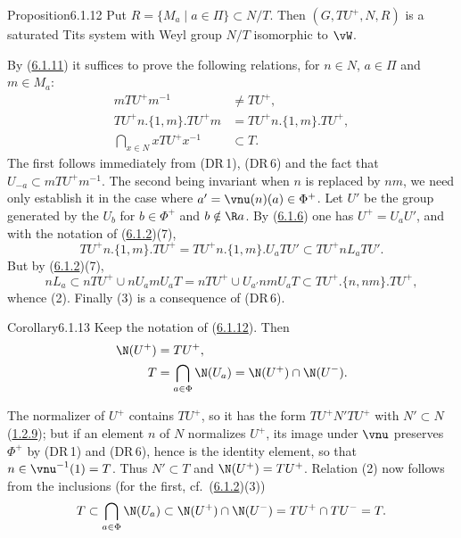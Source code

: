 \documentclass[12pt,a4paper,oneside,english]{smfart}
\makeatletter
\newcommand{\btanchor}[1]{\leavevmode\Hy@raisedlink{\hypertarget{bt:#1}{}}}
\newcommand{\btref}[1]{\hyperlink{bt:#1}{#1}}
\theoremstyle{definition}
\theoremstyle{bt}
\makeatother
\begin{document}
\begin{stmt}{Proposition}{6.1.12}\btanchor{6.1.12}
Put $R=\{M_a\mid a\in\Pi\}\subset N/T$. Then $(G,TU^{+},N,R)$ is a saturated Tits
system with Weyl group $N/T$ isomorphic to $\vW$.
\end{stmt}

\begin{sketch}
By (\btref{6.1.11}) it suffices to prove the following relations, for $n\in N$, $a\in\Pi$
and $m\in M_a$:
\begin{align}
mTU^{+}m^{-1}&\ne TU^{+},\\
TU^{+}n.\{1,m\}.TU^{+}m&=TU^{+}n.\{1,m\}.TU^{+},\\
\bigcap_{x\in N}xTU^{+}x^{-1}&\subset T.
\end{align}
The first follows immediately from (DR\,1), (DR\,6) and the fact that
$U_{-a}\subset mTU^{+}m^{-1}$. The second being invariant when $n$ is replaced by
$nm$, we need only establish it in the case where $a'=\vnu(n)(a)\in\Phi^{+}$. Let
$U'$ be the group generated by the $U_b$ for $b\in\Phi^{+}$ and $b\notin\R a$. By
(\btref{6.1.6}) one has $U^{+}=U_aU'$, and with the notation of (\btref{6.1.2})(7),
\[ TU^{+}n.\{1,m\}.TU^{+}=TU^{+}n.\{1,m\}.U_aTU'\subset TU^{+}nL_aTU'. \]
But by (\btref{6.1.2})(7),
\[ nL_a\subset nTU^{+}\cup nU_amU_aT=nTU^{+}\cup U_{a'}nmU_aT
   \subset TU^{+}.\{n,nm\}.TU^{+}, \]
whence (2). Finally (3) is a consequence of (DR\,6).
\end{sketch}

\begin{stmt}{Corollary}{6.1.13}\btanchor{6.1.13}
Keep the notation of (\btref{6.1.12}). Then
\begin{align}
\N(U^{+})&=TU^{+},\\
T&=\bigcap_{a\in\Phi}\N(U_a)=\N(U^{+})\cap\N(U^{-}).
\end{align}
\end{stmt}

\begin{sketch}
The normalizer of $U^{+}$ contains $TU^{+}$, so it has the form $TU^{+}N'TU^{+}$
with $N'\subset N$ (\btref{1.2.9}); but if an element $n$ of $N$ normalizes $U^{+}$, its
image under $\vnu$ preserves $\Phi^{+}$ by (DR\,1) and (DR\,6), hence is the
identity element, so that $n\in\vnu^{-1}(1)=T$. Thus $N'\subset T$ and
$\N(U^{+})=TU^{+}$. Relation (2) now follows from the inclusions (for the first,
cf.\ (\btref{6.1.2})(3))
\[ T\subset\bigcap_{a\in\Phi}\N(U_a)\subset\N(U^{+})\cap\N(U^{-})
   =TU^{+}\cap TU^{-}=T. \]
\end{sketch}
\end{document}
